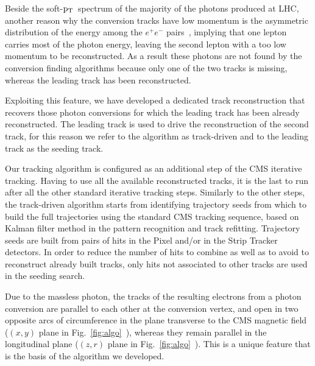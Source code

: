 \documentclass[a4paper]{jpconf}
\def \pt{$\p_{\rm T}$~}
\begin{document}
Beside the soft-\pt spectrum of the majority of the photons produced at LHC, another reason why the conversion tracks have low momentum is the asymmetric distribution of the energy among the $e^+e^-$ pairs~\cite{pdg}, implying that one lepton carries most of the photon energy, leaving the second lepton with a too low momentum to be reconstructed. As a result these photons are not found by the conversion finding algorithms because only one of the two tracks is missing, whereas the leading track has been reconstructed.

Exploiting this feature, we have developed a dedicated track reconstruction that recovers those photon conversions for which the 
leading  track has been already reconstructed. The leading track is used to drive the reconstruction of the second track, for this reason we refer to the algorithm as track-driven and to the leading track as the seeding track.

Our tracking algorithm is configured as an additional step of the CMS iterative tracking. Having to use all the available reconstructed tracks, it is the last to run after all the other standard iterative tracking steps.
%
Similarly to  the other steps, the track-driven algorithm starts from identifying trajectory seeds from which to build the full trajectories using the standard CMS tracking sequence, based on Kalman filter method in the pattern recognition and track refitting.
Trajectory seeds are built from pairs of hits
in the Pixel and/or in the Strip Tracker detectors. 
In order to reduce the number of hits to combine as well as to avoid to reconstruct already built tracks,  only hits not associated to other tracks are used in the seeding search.

Due to the massless photon, the tracks of the resulting electrons from a photon conversion are parallel to each other at the conversion vertex, and open in two opposite arcs of circumference in the  plane transverse to the CMS magnetic field ($(x,y)$ plane in Fig.~\ref{fig:algo}~),
whereas they  remain parallel in the  longitudinal plane ($(z,r)$ plane in Fig.~\ref{fig:algo}~). This is a unique feature that is the basis of the algorithm we developed. 
\end{document}
